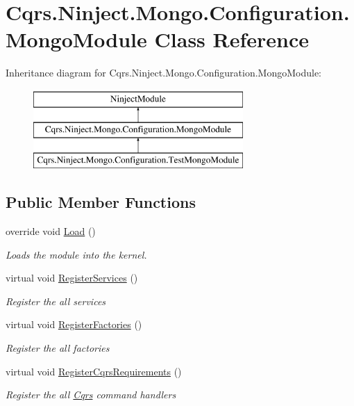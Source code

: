 \hypertarget{classCqrs_1_1Ninject_1_1Mongo_1_1Configuration_1_1MongoModule}{}\section{Cqrs.\+Ninject.\+Mongo.\+Configuration.\+Mongo\+Module Class Reference}
\label{classCqrs_1_1Ninject_1_1Mongo_1_1Configuration_1_1MongoModule}
Inheritance diagram for Cqrs.\+Ninject.\+Mongo.\+Configuration.\+Mongo\+Module\+:\begin{figure}[H]
\begin{center}
\leavevmode
\includegraphics[height=3.000000cm]{classCqrs_1_1Ninject_1_1Mongo_1_1Configuration_1_1MongoModule}
\end{center}
\end{figure}
\subsection*{Public Member Functions}
\begin{DoxyCompactItemize}
\item 
override void \hyperlink{classCqrs_1_1Ninject_1_1Mongo_1_1Configuration_1_1MongoModule_a2c1c276eb2820eede67cf834e430fa19}{Load} ()
\begin{DoxyCompactList}\small\item\em Loads the module into the kernel. \end{DoxyCompactList}\item 
virtual void \hyperlink{classCqrs_1_1Ninject_1_1Mongo_1_1Configuration_1_1MongoModule_a6d0edb4e718b9588671382dd2e183ebc}{Register\+Services} ()
\begin{DoxyCompactList}\small\item\em Register the all services \end{DoxyCompactList}\item 
virtual void \hyperlink{classCqrs_1_1Ninject_1_1Mongo_1_1Configuration_1_1MongoModule_a052d4cd960c3c5da037a04e43424c9c8}{Register\+Factories} ()
\begin{DoxyCompactList}\small\item\em Register the all factories \end{DoxyCompactList}\item 
virtual void \hyperlink{classCqrs_1_1Ninject_1_1Mongo_1_1Configuration_1_1MongoModule_a2753759a99ea08d8a0ef22ed96e52bdb}{Register\+Cqrs\+Requirements} ()
\begin{DoxyCompactList}\small\item\em Register the all \hyperlink{namespaceCqrs}{Cqrs} command handlers \end{DoxyCompactList}\end{DoxyCompactItemize}


